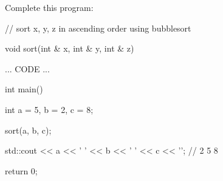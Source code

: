 Complete this program:



\begin{consolethree}[escapeinside=||]

// sort x, y, z in ascending order using bubblesort

void sort(int & x, int & y, int & z)

{

    ... CODE ...

}



int main()

{

    int a = 5, b = 2, c = 8;

    sort(a, b, c);

    std::cout << a << ' ' << b << ' ' << c << '\n'; // 2 5 8

    return 0;

}

\end{consolethree}

